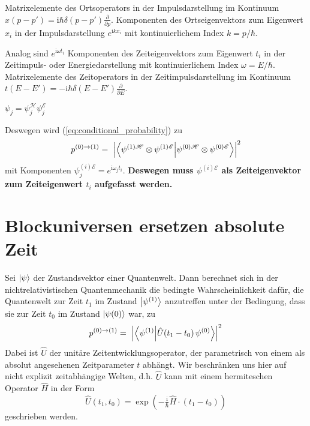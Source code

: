 \documentclass[12pt]{article}
\begin{document}
Matrixelemente des Ortsoperators in der Impulsdarstellung im Kontinuum $x(p-p') = \mathrm{i}\hbar \delta(p-p')\frac{\partial}{\partial p}$. Komponenten des Ortseigenvektors zum Eigenwert $x_i$ in der Impulsdarstellung $e^{\mathrm{i}k x_i}$ mit kontinuierlichem Index $k = p/\hbar$.

Analog sind $e^{\mathrm{i}\omega t_i}$ Komponenten des Zeiteigenvektors zum Eigenwert $t_i$ in der Zeitimpuls- oder Energiedarstellung mit kontinuierlichem Index $\omega=E/\hbar$. Matrixelemente des Zeitoperators in der Zeitimpulsdarstellung im Kontinuum $t(E-E') = -\mathrm{i}\hbar \delta(E-E')\frac{\partial}{\partial E}$.

$\psi_j = \psi_j^\mathscr{H} \psi_j^\mathscr{E}$

Deswegen wird (\ref{eq:conditional_probability}) zu 
\begin{equation} 
p^{(0)\rightarrow(1)} =\ \Bigl| 
\bra{\psi^{(1)\mathscr{H}}\otimes\psi^{(1)\mathscr{E}}}
\ket{\psi^{(0)\mathscr{H}}\otimes\psi^{(0)\mathscr{E}}} \Bigr|^2
\end{equation}
mit Komponenten $\psi_j^{(i)\mathscr{E}}=e^{\mathrm{i}\omega_j t_i}$. 
\textbf{Deswegen muss $\psi^{(i)\mathscr{E}}$ als Zeiteigenvektor zum Zeiteigenwert $t_i$ aufgefasst werden.}


\section{Blockuniversen ersetzen absolute Zeit}
Sei $\ket{\psi}$ der Zustandsvektor einer Quantenwelt. Dann berechnet sich in der nichtrelativistischen Quantenmechanik die bedingte Wahrscheinlichkeit dafür, die Quantenwelt zur Zeit $t_1$ im Zustand $\ket{\psi^{(1)}}$ anzutreffen unter der Bedingung, dass sie zur Zeit $t_0$ im Zustand  $\ket{\psi{(0)}}$ war, zu
\begin{equation} 
\label{eq:conditional_probability}
p^{(0)\rightarrow(1)} =\ \Bigl| \bra{\psi^{(1)}}\ket{\hat{U}(t_1-t_0)\,\psi^{(0)}} \Bigr|^2
\end{equation}
Dabei ist $\hat{U}$ der unitäre Zeitentwicklungsoperator, der parametrisch von einem als absolut angesehenen Zeitparameter $t$ abhängt. Wir beschränken uns hier auf nicht explizit zeitabhängige Welten, d.h. $\hat{U}$ kann mit einem hermiteschen Operator $\hat{H}$ in der Form
\begin{equation}
\label{eq:time_evolution}
\hat{U}(t_1,t_0)=\exp \left(-\tfrac {\mathrm {i} }{\hbar}\hat{H}\cdot (t_1-t_0)\right)
\end{equation}
geschrieben werden. 
\end{document}
